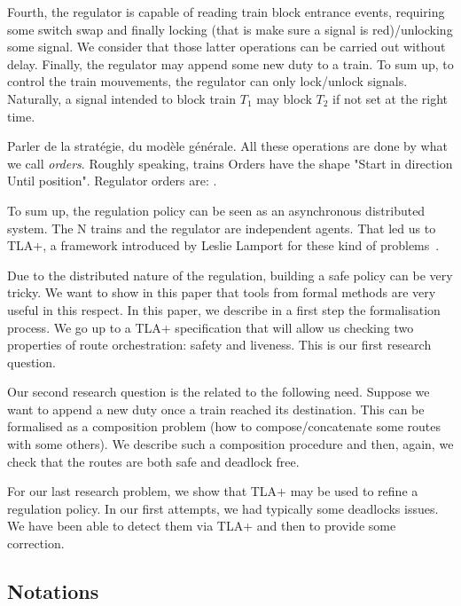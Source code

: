 \documentclass[runningheads]{llncs}
\begin{document}
Fourth,  the regulator is capable of reading train block entrance events, requiring some switch swap and finally locking (that is make sure a signal is red)/unlocking some signal. We consider that those latter operations can be carried out without delay. Finally, the regulator may append some new duty to a train. To sum up, to control the train mouvements, the regulator can only lock/unlock signals. Naturally, a signal intended to block train $T_1$ may block $T_2$ if not set at the right time.   
 
 Parler de la stratégie, du modèle générale. All these operations are done by what we call  \emph{orders}. Roughly speaking, trains Orders have the shape "Start in direction Until position". Regulator orders are: . 
 
 
 To sum up, the regulation policy can be seen as an asynchronous distributed system. The N trains and the regulator are independent agents. That led us to TLA+, a framework introduced by Leslie Lamport for these kind of problems~\cite{Lamport}.  
 
 
 
 
Due to the distributed nature of the regulation, building a safe policy can be very tricky. We want to show in this paper that tools from formal methods are very useful in this respect.  In this paper, we describe in  a first step the formalisation process. We go up to a TLA+ specification that will allow us checking two properties of route orchestration: safety and liveness. This is our first research question. 

Our second research question is the related to the following need. Suppose we want to append a new duty once a train reached its destination. This can be formalised as a composition problem (how to compose/concatenate some routes with some others). We describe such a composition procedure and then, again, we check that the routes are both safe and deadlock free. 

For our last research problem, we show that TLA+ may be used to refine a regulation policy. In our first attempts, we had typically some deadlocks issues. We have been able to detect them via TLA+ and then to provide some correction. 




\subsection{Notations}
\end{document}
